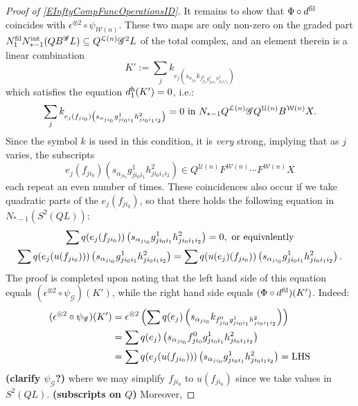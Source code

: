 \documentclass[11pt]{amsart}
\theoremstyle{plain}
\theoremstyle{definition}
\newcommand{\scrG}{\mathscr{G}}
\newcommand{\calU}{\mathcal{U}}
\newcommand{\calL}{\mathcal{L}}
\newcommand{\calw}{\mathcal{W}}
\theoremstyle{plain}
\newcommand{\BSW}{{\scrG}}
\newcommand{\BSWres}{B^\BSW}%
\begin{document}
\begin{Operations in composite functor spectral sequences}
\begin{proof}[Proof of \ref{EInftyCompFuncOperationsID}]
It remains to show that $\Phi\circ d^\textup{fil}$ coincides with $\epsilon^{\otimes 2}\circ\psi_{\calw(n)}$. These two maps are only non-zero on the graded part $N_1^\textup{fil}N_{*-1}^\textup{int}(Q\BSWres L)\subseteq Q^{\calL(n)}\BSW^2 L$ of the total complex, and an element therein is a linear combination
\[K':=\sum_j k_{e_j\left(s_{\alpha_{ji_0}} k_{f^0_{ji_0}g^1_{ji_0i_1}h^2_{ji_0i_1i_2}}\right)}\]
which satisfies the equation $d_1^\textup{h}(K')=0$, i.e.:
\[\sum_j k_{e_j(f_{ji_0})\left(s_{\alpha_{ji_0}} {g^1_{ji_0i_1}h^2_{ji_0i_1i_2}}\right)}=0\textup{ in }N_{*-1}Q^{\calL(n)}\BSW Q^{\calU(n)}B^{\calw(n)}X.\]
Since the symbol $k$ is used in this condition, it is \emph{very} strong, implying that as $j$ varies, the subscripts 
\[e_j(f_{ji_0})\left(s_{\alpha_{ji_0}} {g^1_{ji_0i_1}h^2_{ji_0i_1i_2}}\right)\in Q^{\calU(n)}F^{\calw(n)}\cdots F^{\calw(n)}X\]
each repeat an even number of times. %
These coincidences also occur if we take quadratic parts of the $e_j(f_{ji_0})$, so that there holds the following equation in $N_{*-1}(S^2(QL))$:
\begin{gather*}
\sum q(e_j(f_{ji_0}))\left(s_{\alpha_{ji_0}} {g^1_{ji_0i_1}h^2_{ji_0i_1i_2}}\right)=0,\textup{ or equivalently}\\
\sum q(e_j(u(f_{ji_0})))\left(s_{\alpha_{ji_0}} {g^1_{ji_0i_1}h^2_{ji_0i_1i_2}}\right)
=
\sum q(u(e_j)(f_{ji_0}))\left(s_{\alpha_{ji_0}} {g^1_{ji_0i_1}h^2_{ji_0i_1i_2}}\right).
\end{gather*}
The proof is completed upon noting that the left hand side of this equation equals $(\epsilon^{\otimes 2}\circ \psi_{\BSW})(K')$, while the right hand side equals $(\Phi\circ d^\textup{fil})(K')$. Indeed:
\begin{alignat*}{2}
(\epsilon^{\otimes 2}\circ \psi_{\BSW})(K')
&=
\epsilon^{\otimes 2}\left(\sum q(e_j)\left(s_{\alpha_{ji_0}} k_{f^0_{ji_0}g^1_{ji_0i_1}h^2_{ji_0i_1i_2}}\right)\right)%
\\
&=
\sum q(e_j)\left(s_{\alpha_{ji_0}} f^0_{ji_0}g^1_{ji_0i_1}h^2_{ji_0i_1i_2}\right)%
\\
&=
\sum q(e_j(u(f_{ji_0})))\left(s_{\alpha_{ji_0}} g^1_{ji_0i_1}h^2_{ji_0i_1i_2}\right)=\textup{LHS}
\end{alignat*}
\textbf{(clarify $\psi_{\BSW}$?)} where we may simplify $f_{ji_0}$ to $u(f_{ji_0})$ since we take values in $S^2(QL)$. \textbf{(subscripts on $Q$)} Moreover,

\end{proof}
\end{Operations in composite functor spectral sequences}
\end{document}
